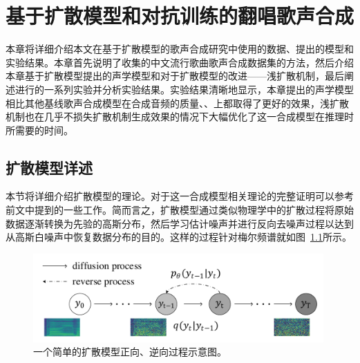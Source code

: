 \newcommand{\etal}{\textit{et al}.}
\newcommand{\ie}{\textit{i}.\textit{e}.}
\newcommand{\vardbtilde}[1]{\tilde{\raisebox{0pt}[0.85\height]{$\tilde{#1}$}}}
\newcommand{\defeq}{\coloneqq}
\newcommand{\grad}{\nabla}
\newcommand{\E}{\mathbb{E}}
\newcommand{\Var}{\mathrm{Var}}
\newcommand{\Cov}{\mathrm{Cov}}
\newcommand{\Ea}[1]{\E\left[#1\right]}
\newcommand{\Eb}[2]{\E_{#1}\!\left[#2\right]}
\newcommand{\Vara}[1]{\Var\left[#1\right]}
\newcommand{\Varb}[2]{\Var_{#1}\left[#2\right]}
\newcommand{\kl}[2]{D_{\mathrm{KL}}\!\left(#1 ~ \| ~ #2\right)}
\newcommand{\pdata}{{p_\mathrm{data}}}
\newcommand{\bA}{\mathbf{A}}
\newcommand{\bI}{\mathbf{I}}
\newcommand{\bJ}{\mathbf{J}}
\newcommand{\bH}{\mathbf{H}}
\newcommand{\bL}{\mathbf{L}}
\newcommand{\bM}{\mathbf{M}}
\newcommand{\bQ}{\mathbf{Q}}
\newcommand{\bR}{\mathbf{R}}
\newcommand{\bzero}{\mathbf{0}}
\newcommand{\bone}{\mathbf{1}}
\newcommand{\bb}{\mathbf{b}}
\newcommand{\bu}{\mathbf{u}}
\newcommand{\bv}{\mathbf{v}}
\newcommand{\bw}{\mathbf{w}}
\newcommand{\bx}{\mathbf{x}}
\newcommand{\by}{\mathbf{y}}
\newcommand{\bz}{\mathbf{z}}
\newcommand{\bxh}{\hat{\mathbf{x}}}
\newcommand{\btheta}{{\boldsymbol{\theta}}}
\newcommand{\bphi}{{\boldsymbol{\phi}}}
\newcommand{\bepsilon}{{\boldsymbol{\epsilon}}}
\newcommand{\bmu}{{\boldsymbol{\mu}}}
\newcommand{\bnu}{{\boldsymbol{\nu}}}
\chapter{基于扩散模型和对抗训练的翻唱歌声合成}
本章将详细介绍本文在基于扩散模型的歌声合成研究中使用的数据、提出的模型和实验结果。本章首先说明了收集的中文流行歌曲歌声合成数据集的方法，然后介绍本章基于扩散模型提出的声学模型和对于扩散模型的改进——浅扩散机制，最后阐述进行的一系列实验并分析实验结果。实验结果清晰地显示，本章提出的声学模型相比其他基线歌声合成模型在合成音频的质量、、上都取得了更好的效果，浅扩散机制也在几乎不损失扩散机制生成效果的情况下大幅优化了这一合成模型在推理时所需要的时间。
\section{扩散模型详述}
本节将详细介绍扩散模型的理论。对于这一合成模型相关理论的完整证明可以参考前文中提到的一些工作\citep{Ho2020ddpm,kong2021diffwave,song2021denoising}。简而言之，扩散模型通过类似物理学中的扩散过程将原始数据逐渐转换为先验的高斯分布，然后学习估计噪声并进行反向去噪声过程以达到从高斯白噪声中恢复数据分布的目的。这样的过程针对梅尔频谱就如图~\ref{fig:two_process}所示。
\begin{figure}[htbp]
	\centering
	\includegraphics[width=0.99\textwidth]{figure/svs/diffusion-new.pdf}
	\caption{一个简单的扩散模型正向、逆向过程示意图。}
	\label{fig:two_process}
\end{figure}
